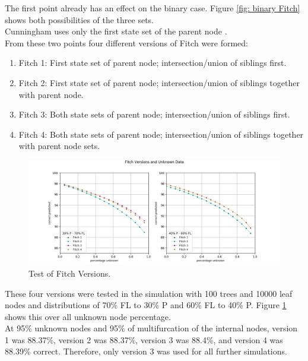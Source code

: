       The first point already has an effect on the binary case. Figure \ref{fig: binary Fitch} shows 
        both possibilities of the three sets. \\
      Cunningham uses only the first state set of the parent node \cite{Cunningham1998}. \\
      From these two points four different versions of Fitch were formed:
      \begin{enumerate}
        \item Fitch 1: First state set of parent node; intersection/union of siblings first.
        \item Fitch 2: First state set of parent node; intersection/union of siblings together with parent node.
        \item Fitch 3: Both state sets of parent node; intersection/union of siblings first.
        \item Fitch 4: Both state sets of parent node; intersection/union of siblings together with parent node sets.
      \end{enumerate}

      \begin{figure}[h!]
        \centering
        \includegraphics[trim = 24mm 0mm 28mm 14mm, clip, width=\textwidth]{Figures/simulation_fitch_evaluation.png}
        \caption{Test of Fitch Versions. }
        \label{fig:Fitch versions}
      \end{figure}
      These four versions were tested in the simulation with 100 trees and 10000 leaf nodes and
        distributions of 70\% FL to 30\% P and 60\% FL to 40\% P. Figure \ref{fig:Fitch versions} shows 
        this over all unknown node percentage. \\
      At 95\% unknown nodes and 95\% of multifurcation of the internal nodes, version 1 was 88.37\%, 
        version 2 was 88.37\%, version 3 was 88.4\%, and version 4 was 88.39\% correct. Therefore, 
        only version 3 was used for all further simulations.
        
